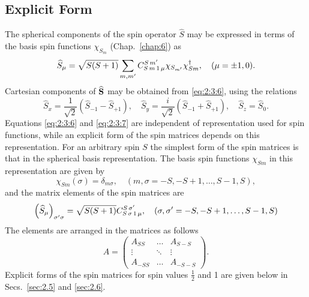 \subsection{Explicit Form}
The spherical components of the spin operator $\widehat{S}$ may be expressed in terms of the basis spin functions $\chi_{S_{m}}$ (Chap.~\ref{chap:6}) as
\begin{equation}
\widehat{S}_{\mu}=\sqrt{S(S+1)} \sum_{m, m^{\prime}} C_{S\,m\,1\,\mu}^{S\,m^{\prime}} \chi_{S_{m^{\prime}}} \chi_{S m}^{\dagger}, \quad(\mu= \pm 1,0) .\label{eq:2:3:6}
\end{equation}
Cartesian components of $\widehat{\mathbf{S}}$ may be obtained from \eqref{eq:2:3:6}, using the relations
\begin{equation}
\widehat{S}_{x}=\frac{1}{\sqrt{2}}\left(\widehat{S}_{-1}-\widehat{S}_{+1}\right), \quad \widehat{S}_{y}=\frac{i}{\sqrt{2}}\left(\widehat{S}_{-1}+\widehat{S}_{+1}\right), \quad \widehat{S}_{z}=\widehat{S}_{0}. \label{eq:2:3:7}
\end{equation}
Equations \eqref{eq:2:3:6} and \eqref{eq:2:3:7} are independent of representation used for spin functions, while an explicit form of the spin matrices depends on this representation. For an arbitrary spin $S$ the simplest form of the spin matrices is that in the spherical basis representation. The basis spin functions $\chi_{S m}$ in this representation are given by
\begin{equation}
\chi_{S m}(\sigma)=\delta_{m \sigma}, \quad(m, \sigma=-S,-S+1, \ldots, S-1, S) \label{eq:2:3:8},
\end{equation}
and the matrix elements of the spin matrices are
\begin{equation}
\left(\widehat{S}_{\mu}\right)_{\sigma^{\prime} \sigma}=\sqrt{S(S+1)} C_{S\,\sigma\,1\,\mu}^{S\,\sigma^{\prime}}, \quad\left(\sigma, \sigma^{\prime}=-S,-S+1, \ldots, S-1, S\right) \label{eq:2:3:9}
\end{equation}
The elements are arranged in the matrices as follows
\begin{equation}
A=\begin{pmatrix}
A_{S S} &\ldots & A_{S-S}  \\
\vdots  &\ddots & \vdots \\
A_{-S S} &\ldots & A_{-S-S}
\end{pmatrix}.\label{eq:2:3:10}
\end{equation}
Explicit forms of the spin matrices for spin values $\frac{1}{2}$ and 1 are given below in Secs.~\ref{sec:2.5} and \ref{sec:2.6}.

